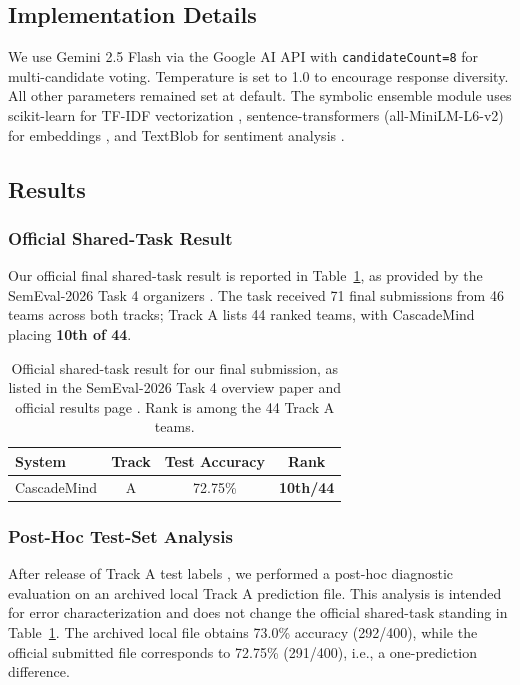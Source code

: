 \documentclass[11pt]{article}
\begin{document}
\subsection{Implementation Details}

We use Gemini 2.5 Flash via the Google AI API \citep{google-generative-ai-api-2025} with \texttt{candidateCount=8} for multi-candidate voting. Temperature is set to 1.0 to encourage response diversity. All other parameters remained set at default. The symbolic ensemble module uses scikit-learn for TF-IDF vectorization \citep{pedregosa2011scikit}, sentence-transformers (all-MiniLM-L6-v2) for embeddings \citep{reimers2019sentence,reimers2020allminilm}, and TextBlob for sentiment analysis \citep{loria2018textblob}.

\subsection{Results}

\subsubsection{Official Shared-Task Result}
Our official final shared-task result is reported in Table~\ref{tab:official_results}, as provided by the SemEval-2026 Task 4 organizers \citep{hatzel-etal-2026-semeval,narrative-similarity-results-2026}. The task received 71 final submissions from 46 teams across both tracks; Track A lists 44 ranked teams, with CascadeMind placing \textbf{10th of 44}.

\begin{table}[t]
\centering
\small
\begin{tabular}{lccc}
\toprule
\textbf{System} & \textbf{Track} & \textbf{Test Accuracy} & \textbf{Rank} \\
\midrule
CascadeMind & A & 72.75\% & \textbf{10th/44} \\
\bottomrule
\end{tabular}
\caption{Official shared-task result for our final submission, as listed in the SemEval-2026 Task 4 overview paper and official results page \citep{hatzel-etal-2026-semeval,narrative-similarity-results-2026}. Rank is among the 44 Track A teams.}
\label{tab:official_results}
\end{table}

\subsubsection{Post-Hoc Test-Set Analysis}
After release of Track A test labels \citep{narrative-similarity-dataset-2026}, we performed a post-hoc diagnostic evaluation on an archived local Track A prediction file. This analysis is intended for error characterization and does not change the official shared-task standing in Table~\ref{tab:official_results}. The archived local file obtains 73.0\% accuracy (292/400), while the official submitted file corresponds to 72.75\% (291/400), i.e., a one-prediction difference.
\end{document}
